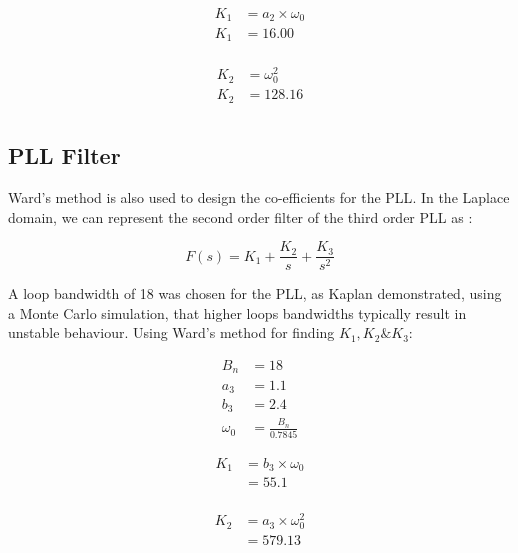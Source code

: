 \begin{equation} \label{eq1}
\begin{split}
K_1 & = a_2 \times \omega_{0}\\
K_1 & = 16.00\\
\end{split}
\end{equation}

\begin{equation} \label{eq2}
\begin{split}
K_2 & = \omega_{0}^2\\
K_2 & = 128.16\\
\end{split}
\end{equation}

\subsection{\ac{PLL} Filter}
Ward's method is also used to design the co-efficients for the \ac{PLL}. In the Laplace domain, we can represent the second order filter  of the third order \ac{PLL} as : 

\begin{equation} \label{eq6}
F(s) = K_1 + \frac{K_2}{s} + \frac{K_3}{s^2}
\end{equation}

A loop bandwidth of 18 was chosen for the \ac{PLL}, as Kaplan\cite{Kaplan} demonstrated, using a Monte Carlo simulation, that higher loops bandwidths typically result in unstable behaviour. 
Using Ward's method\cite{Ward} for finding $K_1,K_2\&K_3$:

\begin{align*}
B_n &= 18\\
a_3&=1.1\\
b_3&=2.4\\
\omega_{0}&=\frac{B_n}{0.7845}
\end{align*}

\begin{equation} \label{eq3}
\begin{split}
K_1 & = b_3 \times \omega_{0}\\
    & = 55.1\\
\end{split}
\end{equation}

\begin{equation} \label{eq4}
\begin{split}
K_2 & = a_3 \times \omega_{0}^2\\ 
    & = 579.13\\
\end{split}
\end{equation}

